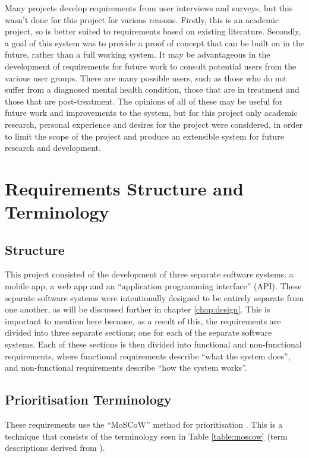\documentclass[11pt,openright,a4paper]{report}
\begin{document}
Many projects develop requirements from user interviews and surveys, but this wasn't done for this project for various reasons. Firstly, this is an academic project, so is better suited to requirements based on existing literature. Secondly, a goal of this system was to provide a proof of concept that can be built on in the future, rather than a full working system. It may be  advantageous in the development of requirements for future work to consult potential users from the various user groups. There are many possible users, such as those who do not suffer from a diagnosed mental health condition, those that are in treatment and those that are post-treatment. The opinions of all of these may be useful for future work and improvements to the system, but for this project only academic research, personal experience and desires for the project were considered, in order to limit the scope of the project and produce an extensible system for future research and development.

\section{Requirements Structure and Terminology}
\subsection{Structure}
This project consisted of the development of three separate software systems: a mobile app, a web app and an \enquote{application programming interface} (API). These separate software systems were intentionally designed to be entirely separate from one another, as will be discussed further in chapter \ref{chap:design}. This is important to mention here because, as a result of this, the requirements are divided into three separate sections; one for each of the separate software systems. Each of these sections is then divided into functional and non-functional requirements, where functional requirements describe \enquote{what the system does}, and non-functional requirements describe \enquote{how the system works}.

\subsection{Prioritisation Terminology}
These requirements use the \enquote{MoSCoW} method for prioritisation \parencite{moscowmethod}. This is a technique that consists of the terminology seen in Table \ref{table:moscow} (term descriptions derived from \parencite{moscowmethod}).
\end{document}
